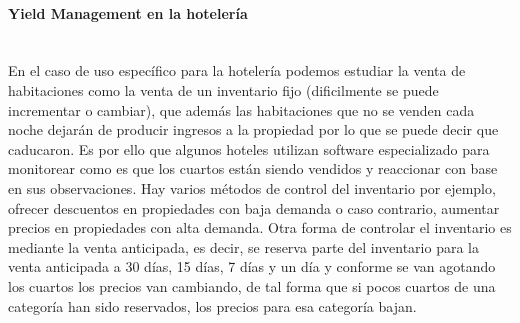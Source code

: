 \documentclass{article}\usepackage[]{graphicx}\usepackage[]{color}
\begin{document}
\paragraph{Yield Management en la hotelería}~\\
En el caso de uso específico para la hotelería podemos estudiar la venta de habitaciones como la venta de un inventario fijo (dificilmente se puede incrementar o cambiar), que además las habitaciones que no se venden cada noche dejarán de producir ingresos a la propiedad por lo que se puede decir que caducaron. Es por ello que algunos hoteles utilizan software especializado para monitorear como es que los cuartos están siendo vendidos y reaccionar con base en sus observaciones. Hay varios métodos de control del inventario por ejemplo, ofrecer descuentos en propiedades con baja demanda o caso contrario, aumentar precios en propiedades con alta demanda. Otra forma de controlar el inventario es mediante la venta anticipada, es decir, se reserva parte del inventario para la venta anticipada a 30 días, 15 días, 7 días y un día y conforme se van agotando los cuartos los precios van cambiando, de tal forma que si pocos cuartos de una categoría han sido reservados, los precios para esa categoría bajan.
~\\
\end{document}
